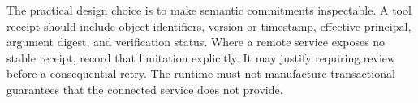 The practical design choice is to make semantic commitments inspectable. A tool receipt should include object identifiers, version or timestamp, effective principal, argument digest, and verification status. Where a remote service exposes no stable receipt, record that limitation explicitly. It may justify requiring review before a consequential retry. The runtime must not manufacture transactional guarantees that the connected service does not provide.

